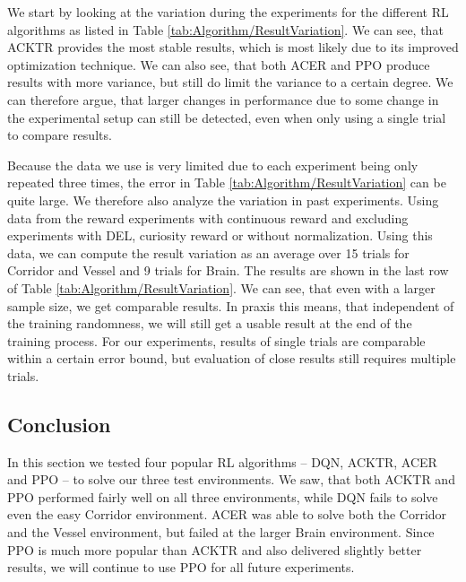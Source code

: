 We start by looking at the variation during the experiments for the different RL algorithms as listed in Table \ref{tab:Algorithm/ResultVariation}. We can see, that ACKTR provides the most stable results, which is most likely due to its improved optimization technique. We can also see, that both ACER and PPO produce results with more variance, but still do limit the variance to a certain degree. We can therefore argue, that larger changes in performance due to some change in the experimental setup can still be detected, even when only using a single trial to compare results. 

Because the data we use is very limited due to each experiment being only repeated three times, the error in Table \ref{tab:Algorithm/ResultVariation} can be quite large. We therefore also analyze the variation in past experiments. Using data from the reward experiments with continuous reward and excluding experiments with DEL, curiosity reward or without normalization. Using this data, we can compute the result variation as an average over 15 trials for Corridor and Vessel and 9 trials for Brain. The results are shown in the last row of Table \ref{tab:Algorithm/ResultVariation}. We can see, that even with a larger sample size, we get comparable results. In praxis this means, that independent of the training randomness, we will still get a usable result at the end of the training process. For our experiments, results of single trials are comparable within a certain error bound, but evaluation of close results still requires multiple trials.

\subsection{Conclusion}
In this section we tested four popular RL algorithms -- DQN, ACKTR, ACER and PPO -- to solve our three test environments. We saw, that both ACKTR and PPO performed fairly well on all three environments, while DQN fails to solve even the easy Corridor environment. ACER was able to solve both the Corridor and the Vessel environment, but failed at the larger Brain environment. Since PPO is much more popular than ACKTR and also delivered slightly better results, we will continue to use PPO for all future experiments. 


